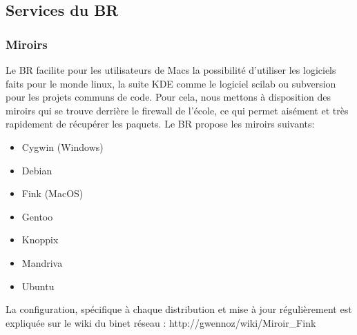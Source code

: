 \subsection{Services du BR}
\subsubsection{Miroirs}
Le BR facilite pour les utilisateurs de Macs la possibilit\'e d'utiliser les logiciels faits pour le monde linux, la suite KDE comme le logiciel scilab ou subversion pour les projets communs de code. Pour cela, nous mettons \`a disposition des miroirs qui se trouve derri\`ere le firewall de l'\'ecole, ce qui permet ais\'ement et tr\`es rapidement de r\'ecup\'erer les paquets. Le BR propose les miroirs suivants:
\begin{itemize}
\item Cygwin (Windows)
\item Debian
\item Fink (MacOS)
\item Gentoo
\item Knoppix
\item Mandriva
\item Ubuntu
\end{itemize}

La configuration, sp\'ecifique \`a chaque distribution et mise \`a jour r\'eguli\`erement est expliqu\'ee sur le wiki du binet r\'eseau : 
http://gwennoz/wiki/Miroir\_Fink
